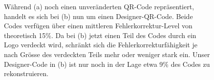 \begin{figure}
	\centering
	\caption{Während (a) noch einen unveränderten QR-Code repräsentiert, handelt es sich bei (b) nun um einen Designer-QR-Code. Beide Codes verfügen über einen mittleren Fehlerkorrektur-Level von theoretisch 15\%. Da bei (b) jetzt einen Teil des Codes durch ein Logo verdeckt wird, schränkt sich die Fehlerkorrekturfähigkeit je nach Grösse des verdeckten Teils mehr oder weniger stark ein. Unser Designer-Code in (b) ist nur noch in der Lage etwa 9\% des Codes zu rekonstruieren.}
	\label{fig:designqr}
\end{figure}